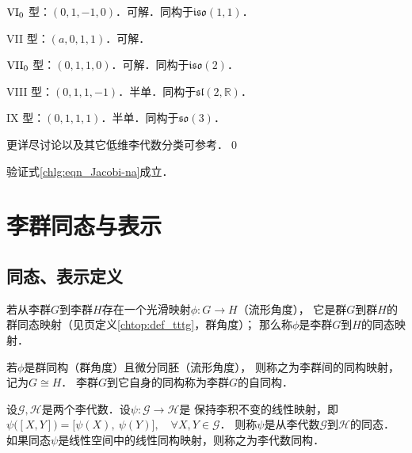 {$\rm VI_0$ 型}：$(0,1,-1,0)$．可解．同构于$\mathfrak{iso}(1,1)$．

{VII 型}：$(a,0,1,1)$．可解．

{$\rm VII_0$ 型}：$(0,1,1,0)$．可解．同构于$\mathfrak{iso}(2)$．

{VIII 型}：$(0,1,1,-1)$．半单．同构于$\mathfrak{sl}(2,\mathbb{R})$．

{IX 型}：$(0,1,1,1)$．半单．同构于$\mathfrak{so}(3)$．


更详尽讨论以及其它低维李代数分类可参考\parencite{Popovych_2003}．\qed

\begin{exercise}
	验证式\eqref{chlg:eqn_Jacobi-na}成立．
\end{exercise}


\section{李群同态与表示}\label{chlg:sec_liesg}


\subsection{同态、表示定义}\label{chlg:sec_lieiso}
\begin{definition}\label{chlg:def_homomorphism-LG}
    若从李群$G$到李群$H$存在一个{\kaishu 光滑映射}$\phi:G\to H$（流形角度），
    它是群$G$到群$H$的群同态映射（见\pageref{chtop:def_tttg}页定义\ref{chtop:def_tttg}，群角度）；
    那么称$\phi$是李群$G$到$H$的{\heiti 同态映射}．
    
    若$\phi$是群同构（群角度）且微分同胚（流形角度），
    则称之为李群间的{\heiti 同构映射}，记为$G \cong H$．
    李群$G$到它自身的同构称为李群$G$的{\heiti 自同构}．
\end{definition}


\begin{definition}\label{chlg:def_homomorphism-LA}
    设$\mathscr{G},\mathscr{H}$是两个李代数．设$\psi:\mathscr{G}\to \mathscr{H}$是
    保持李积不变的线性映射，即
       $ \psi\bigl([X, Y]\bigr) = \bigl[\psi(X),\ \psi(Y)\bigr],
        \quad \forall X, Y \in \mathscr{G} $．
    则称$\psi$是从李代数$\mathscr{G}$到$\mathscr{H}$的{\heiti 同态}．
    如果同态$\psi$是线性空间中的线性同构映射，则称之为李代数{\heiti 同构}．
\end{definition}

